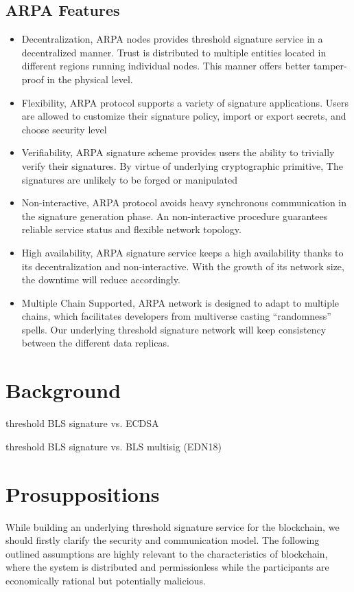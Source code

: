 \documentclass[11pt]{article}
\begin{document}
\subsection{ARPA Features}
\begin{itemize}
    \item Decentralization, ARPA nodes provides threshold signature service in a decentralized manner. Trust is distributed to multiple entities located in different regions running individual nodes. This manner offers better tamper-proof in the physical level.
    \item Flexibility, ARPA protocol supports a variety of signature applications. Users are allowed to customize their signature policy, import or export secrets, and choose security level
    \item Verifiability, ARPA signature scheme provides users the ability to trivially verify their signatures. By virtue of underlying cryptographic primitive, The signatures are unlikely to be forged or manipulated
    \item Non-interactive, ARPA protocol avoids heavy synchronous communication in the signature generation phase. An non-interactive procedure guarantees reliable service status and flexible network topology.
    \item High availability, ARPA signature service keeps a high availability thanks to its decentralization and non-interactive. With the growth of its network size, the downtime will reduce accordingly.
    \item Multiple Chain Supported, ARPA network is designed to adapt to multiple chains, which facilitates developers from multiverse casting “randomness” spells. Our underlying threshold signature network will keep consistency between the different data replicas.
\end{itemize}



\section{Background}

threshold BLS signature vs. ECDSA

threshold BLS signature vs. BLS multisig (EDN18)

\section{Prosuppositions}

While building an underlying threshold signature service for the blockchain, we should firstly clarify the security and communication model. The following outlined assumptions are highly relevant to the characteristics of blockchain, where the system is distributed and permissionless while the participants are economically rational but potentially malicious.
\end{document}
